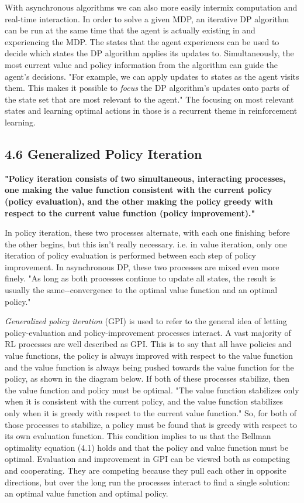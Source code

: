 \documentclass[11pt]{article}
\begin{document}
With asynchronous algorithms we can also more easily intermix
computation and real-time interaction. In order to solve a given MDP, an
iterative DP algorithm can be run at the same time that the agent is
actually existing in and experiencing the MDP. The states that the agent
experiences can be used to decide which states the DP algorithm applies
its updates to. Simultaneously, the most current value and policy
information from the algorithm can guide the agent's decisions. "For
example, we can apply updates to states as the agent visits them. This
makes it possible to \emph{focus} the DP algorithm's updates onto parts
of the state set that are most relevant to the agent." The focusing on
most relevant states and learning optimal actions in those is a
recurrent theme in reinforcement learning.

    \subsection{4.6 Generalized Policy
Iteration}\label{generalized-policy-iteration}

    \textbf{"Policy iteration consists of two simultaneous, interacting
processes, one making the value function consistent with the current
policy (policy evaluation), and the other making the policy greedy with
respect to the current value function (policy improvement)."}

In policy iteration, these two processes alternate, with each one
finishing before the other begins, but this isn't really necessary. i.e.
in value iteration, only one iteration of policy evaluation is performed
between each step of policy improvement. In asynchronous DP, these two
processes are mixed even more finely. "As long as both processes
continue to update all states, the result is usually the
same-\/-convergence to the optimal value function and an optimal
policy."

\emph{Generalized policy iteration} (GPI) is used to refer to the
general idea of letting policy-evaluation and policy-improvement
processes interact. A vast majority of RL processes are well described
as GPI. This is to say that all have policies and value functions, the
policy is always improved with respect to the value function and the
value function is always being pushed towards the value function for the
policy, as shown in the diagram below. If both of these processes
stabilize, then the value function and policy must be optimal. "The
value function stabilizes only when it is consistent with the current
policy, and the value function stabilizes only when it is greedy with
respect to the current value function." So, for both of those processes
to stabilize, a policy must be found that is greedy with respect to its
own evaluation function. This condition implies to us that the Bellman
optimality equation (4.1) holds and that the policy and value function
must be optimal. Evaluation and improvement in GPI can be viewed both as
competing and cooperating. They are competing because they pull each
other in opposite directions, but over the long run the processes
interact to find a single solution: an optimal value function and
optimal policy.
\end{document}
